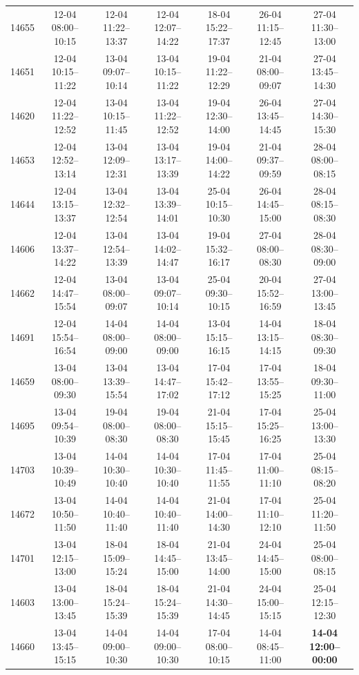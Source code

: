 \begin{table}[htbp]
\begin{tabular}{|r|c|c|c|c|c|c|}
14655 & 12-04 08:00--10:15 & 12-04 11:22--13:37 & 12-04 12:07--14:22 & 18-04 15:22--17:37 & 26-04 11:15--12:45 & 27-04 11:30--13:00 \\ 
14651 & 12-04 10:15--11:22 & 13-04 09:07--10:14 & 13-04 10:15--11:22 & 19-04 11:22--12:29 & 21-04 08:00--09:07 & 27-04 13:45--14:30 \\ 
14620 & 12-04 11:22--12:52 & 13-04 10:15--11:45 & 13-04 11:22--12:52 & 19-04 12:30--14:00 & 26-04 13:45--14:45 & 27-04 14:30--15:30 \\ 
14653 & 12-04 12:52--13:14 & 13-04 12:09--12:31 & 13-04 13:17--13:39 & 19-04 14:00--14:22 & 21-04 09:37--09:59 & 28-04 08:00--08:15 \\ 
14644 & 12-04 13:15--13:37 & 13-04 12:32--12:54 & 13-04 13:39--14:01 & 25-04 10:15--10:30 & 26-04 14:45--15:00 & 28-04 08:15--08:30 \\ 
14606 & 12-04 13:37--14:22 & 13-04 12:54--13:39 & 13-04 14:02--14:47 & 19-04 15:32--16:17 & 27-04 08:00--08:30 & 28-04 08:30--09:00 \\ 
14662 & 12-04 14:47--15:54 & 13-04 08:00--09:07 & 13-04 09:07--10:14 & 25-04 09:30--10:15 & 20-04 15:52--16:59 & 27-04 13:00--13:45 \\ 
14691 & 12-04 15:54--16:54 & 14-04 08:00--09:00 & 14-04 08:00--09:00 & 13-04 15:15--16:15 & 14-04 13:15--14:15 & 18-04 08:30--09:30 \\ 
14659 & 13-04 08:00--09:30 & 13-04 13:39--15:54 & 13-04 14:47--17:02 & 17-04 15:42--17:12 & 17-04 13:55--15:25 & 18-04 09:30--11:00 \\ 
14695 & 13-04 09:54--10:39 & 19-04 08:00--08:30 & 19-04 08:00--08:30 & 21-04 15:15--15:45 & 17-04 15:25--16:25 & 25-04 13:00--13:30 \\ 
14703 & 13-04 10:39--10:49 & 14-04 10:30--10:40 & 14-04 10:30--10:40 & 17-04 11:45--11:55 & 17-04 11:00--11:10 & 25-04 08:15--08:20 \\ 
14672 & 13-04 10:50--11:50 & 14-04 10:40--11:40 & 14-04 10:40--11:40 & 21-04 14:00--14:30 & 17-04 11:10--12:10 & 25-04 11:20--11:50 \\ 
14701 & 13-04 12:15--13:00 & 18-04 15:09--15:24 & 18-04 14:45--15:00 & 21-04 13:45--14:00 & 24-04 14:45--15:00 & 25-04 08:00--08:15 \\ 
14603 & 13-04 13:00--13:45 & 18-04 15:24--15:39 & 18-04 15:24--15:39 & 21-04 14:30--14:45 & 24-04 15:00--15:15 & 25-04 12:15--12:30 \\ 
14660 & 13-04 13:45--15:15 & 14-04 09:00--10:30 & 14-04 09:00--10:30 & 17-04 08:00--10:15 & 14-04 08:45--11:00 & \textbf{14-04 12:00--00:00} \\ 

\end{tabular}
\end{table}
